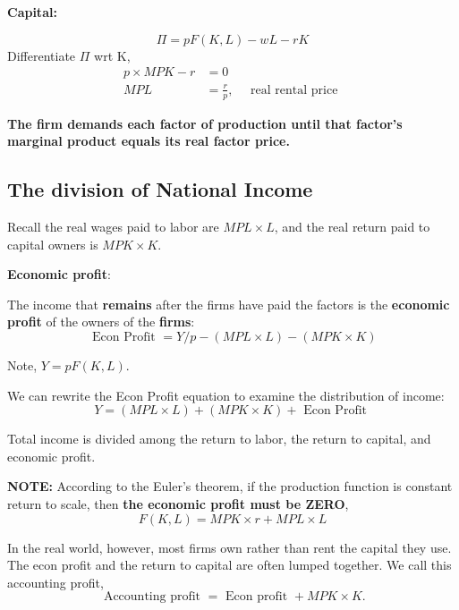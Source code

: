 \documentclass[12pt]{article}
\begin{document}
{\textbf {Capital:}}

\begin{equation*}
\Pi = pF(K,L) - wL - rK
\end{equation*}
Differentiate $ \Pi $ wrt K,
\begin{align*}
p  \times MPK  - r &= 0\\
MPL &= \frac{r}{p}, \quad \text{ real rental price }
\end{align*}

{\textbf {The firm demands each factor of production until that factor’s marginal 
product equals its real factor price.}}


\subsection{The division of National Income}

Recall the real wages paid to labor are $ MPL  \times L $, and the real return paid to
capital owners is $ MPK  \times K $.

{\textbf {Economic profit}}:

The income that {\textbf {remains}} after the firms have paid the factors is the 
{\textbf {economic profit}} of the owners of the {\textbf {firms}}:
\begin{equation*}
\text{ Econ Profit } = Y/p - (MPL  \times L) - (MPK  \times K)
\end{equation*}

Note, $ Y = p F(K,L) $.

We can rewrite the Econ Profit equation to examine the distribution of income:
\begin{equation*}
Y = (MPL  \times L) + (MPK  \times K) + \text{ Econ Profit }
\end{equation*}

Total income is divided among the return to labor, the return to capital, and economic 
profit.

{\textbf {NOTE:}} According to the Euler's theorem, if the production function is
constant return to scale, then {\textbf {the economic profit must be ZERO}},
\begin{equation*}
F(K,L) = MPK  \times r + MPL  \times L
\end{equation*}


In the real world, however, most firms own rather than rent the capital they use. The
econ profit and the return to capital are often lumped together. We call this 
accounting profit,
\begin{equation*}
\text{ Accounting profit } = \text{ Econ profit } + MPK  \times K.
\end{equation*}
\end{document}
